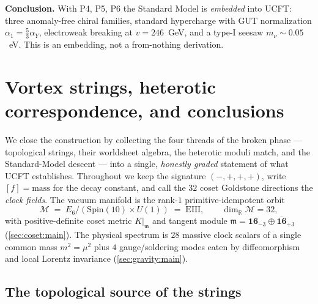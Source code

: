 \documentclass[11pt]{article}
\theoremstyle{plain}
\theoremstyle{definition}
\theoremstyle{remark}
\begin{document}
\noindent\textbf{Conclusion.} With P4, P5, P6 the Standard Model is \emph{embedded}
into UCFT: three anomaly-free chiral families, standard hypercharge with GUT
normalization $\alpha_1=\tfrac53\alpha_Y$, electroweak breaking at $v=246$~GeV, and a
type-I seesaw $m_\nu\sim0.05$~eV. This is an embedding, not a from-nothing derivation.


\section{Vortex strings, heterotic correspondence, and conclusions}
\label{sec:strings:main}
\label{sec:strings}

We close the construction by collecting the four threads of the broken
phase --- topological strings, their worldsheet algebra, the heterotic
moduli match, and the Standard-Model descent --- into a single,
\emph{honestly graded} statement of what UCFT establishes. Throughout we
keep the signature $(-,+,+,+)$, write $[f]=\text{mass}$ for the decay
constant, and call the $32$ coset Goldstone directions the \emph{clock
fields}. The vacuum manifold is the rank-$1$ primitive-idempotent orbit
\begin{equation}
  \mathcal{M} \;=\; E_{6}/(\mathrm{Spin}(10)\times U(1)) \;=\; \mathrm{EIII},
  \qquad \dim_{\mathbb{R}}\mathcal{M}=32,
  \label{eq:strings:vacuum}
\end{equation}
with positive-definite coset metric $K|_{\mathfrak m}$ and tangent module
$\mathfrak m = \mathbf{16}_{-3}\oplus\overline{\mathbf{16}}_{+3}$
(\autoref{sec:coset:main}). The physical spectrum is $28$ massive clock
scalars of a single common mass $m^{2}=\mu^{2}$ plus $4$ gauge/soldering
modes eaten by diffeomorphism and local Lorentz invariance
(\autoref{sec:gravity:main}).

\subsection{The topological source of the strings}
\label{sec:strings:topology}
\end{document}
